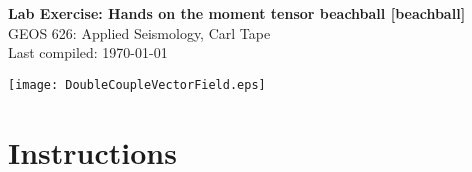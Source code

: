 \documentclass[11pt,titlepage,fleqn]{article}
\begin{document}

\begin{spacing}{1.2}
\centering
{\large \bf Lab Exercise: Hands on the moment tensor beachball [beachball]} \\
GEOS 626: Applied Seismology, Carl Tape \\
Last compiled: \today \\
\end{spacing}


\vspace{-4.4cm}
\begin{center}
\texttt{[image: DoubleCoupleVectorField.eps]}
\end{center}


\vspace{-1.8cm}
\section*{Instructions}
\end{document}
